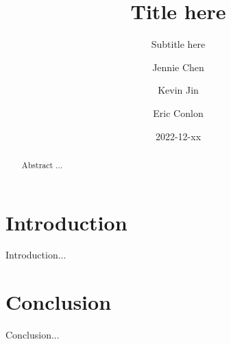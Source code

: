 \documentclass[format=acmsmall, nonacm=true, review=true, screen=true]{acmart}
\title{Title here}
\subtitle{Subtitle here}
\author{Jennie Chen}
\author{Kevin Jin}
\author{Eric Conlon}
\date{2022-12-xx}
\begin{document}
\begin{abstract}

Abstract ...

\end{abstract}

\maketitle

\section{Introduction}

Introduction...

\section{Conclusion}

Conclusion...



\end{document}
